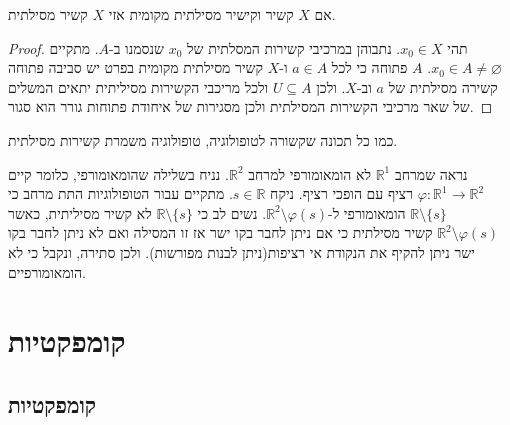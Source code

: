 \documentclass{tstextbook}
\begin{document}
\begin{proposition}
אם \(X\) קשיר וקישיר מסילתית מקומית אזי \(X\) קשיר מסילתית.

\end{proposition}
\begin{proof}
תהי \(x_{0} \in X\). נתבוהן במרכיבי קשירות המסלתית של \(x_{0}\) שנסמנו ב-\(A\). מתקיים \(x_{0} \in A\neq \varnothing\). \(A\) פתוחה כי לכל \(a \in A\) ו-\(X\) קשיר מסילתית מקומית בפרט יש סביבה פתוחה קשירה מסילתית של \(a\) וב-\(X\).
ולכן \(U\subseteq A\) ולכל מריכבי הקשירות מסיליתית יתאים המשלים של שאר מרכיבי הקשירות המסילתית ולכן מסגירות של איחודת פתוחות גורר הוא סגור.

\end{proof}
\begin{proposition}
כמו כל תכונה שקשורה לטופולוגיה, טופולוגיה משמרת קשירות מסילתית.

\end{proposition}
\begin{example}
נראה שמרחב \(\mathbb{R}^{1}\) לא הומאומורפי למרחב \(\mathbb{R}^{2}\). נניח בשלילה שהומאומורפי, כלומר קיים \(\varphi:\mathbb{R}^{1}\to \mathbb{R}^{2}\) רציף עם הופכי רציף.
ניקח \(s \in \mathbb{R}\). מתקיים עבור הטופולוגיות התת מרחב כי \(\mathbb{R}\setminus \{ s \}\) הומאומורפי ל-\(\mathbb{R}^{2}\setminus \varphi(s)\). נשים לב כי \(\mathbb{R}\setminus \{ s \}\) לא קשיר מסיליתית, כאשר \(\mathbb{R}^{2}\setminus \varphi(s)\) קשיר מסילתית כי אם ניתן לחבר בקו ישר אז זו המסילה ואם לא ניתן לחבר בקו ישר ניתן להקיף את הנקודת אי רציפות(ניתן לבנות מפורשות). ולכן סתירה, ונקבל כי לא הומאומורפיים.

\end{example}
\chapter{קומפקטיות}

\section{קומפקטיות}
\end{document}
